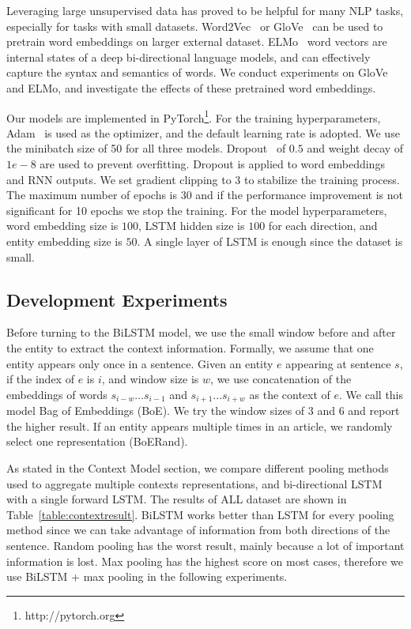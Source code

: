 \documentclass[letterpaper]{article} %
\begin{document}
Leveraging large unsupervised data has proved to be helpful for many NLP tasks, especially for tasks with small datasets. Word2Vec~\cite{DBLP:journals/corr/abs-1301-3781} or GloVe~\cite{pennington2014glove} can be used to pretrain word embeddings on larger external dataset. ELMo~\cite{Peters:2018} word vectors are internal states of a deep bi-directional language models, and can effectively capture the syntax and semantics of words. We conduct experiments on GloVe and ELMo, and investigate the effects of these pretrained word embeddings.

Our models are implemented in PyTorch\footnote{http://pytorch.org}. For the training hyperparameters, Adam~\cite{kingma2014adam} is used as the optimizer, and the default learning rate is adopted. We use the minibatch size of 50 for all three models. Dropout~\cite{hinton2012improving} of $0.5$ and weight decay of $1e-8$ are used to prevent overfitting. Dropout is applied to word embeddings and RNN outputs. We set gradient clipping to 3 to stabilize the training process. The maximum number of epochs is 30 and if the performance improvement is not significant for 10 epochs we stop the training. For the model hyperparameters, word embedding size is $100$, LSTM hidden size is $100$ for each direction, and entity embedding size is $50$. A single layer of LSTM is enough since the dataset is small.

\subsection{Development Experiments}

Before turning to the BiLSTM model, we use the small window before and after the entity to extract the context information. Formally, we assume that one entity appears only once in a sentence. Given an entity $e$ appearing at sentence $s$, if the index of $e$ is $i$, and window size is $w$, we use concatenation of the embeddings of words $s_{i-w}\ldots s_{i-1}$ and $s_{i+1}\ldots s_{i+w}$ as the context of $e$. We call this model Bag of Embeddings (BoE). We try the window sizes of 3 and 6 and report the higher result. If an entity appears multiple times in an article, we randomly select one representation (BoERand).

As stated in the Context Model section, we compare different pooling methods used to aggregate multiple contexts representations, and bi-directional LSTM with a single forward LSTM. The results of ALL dataset are shown in Table~\ref{table:contextresult}. BiLSTM works better than LSTM for every pooling method since we can take advantage of information from both directions of the sentence. Random pooling has the worst result, mainly because a lot of important information is lost. Max pooling has the highest score on most cases, therefore we use BiLSTM + max pooling in the following experiments.
\end{document}
